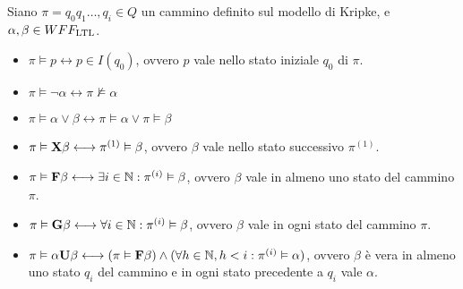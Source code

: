 Siano $\pi = q_0 q_1 \ldots, q_i \in Q$ un cammino definito sul modello di Kripke, e $\alpha, \beta \in WFF_{\textnormal{LTL}}$.
\begin{itemize}
    \item $\pi \vDash p \longleftrightarrow p \in I(q_0)$, ovvero $p$ vale nello stato iniziale $q_0$ di $\pi$.
    \item $\pi \vDash \lnot \alpha \longleftrightarrow \pi \nvDash \alpha$
    \item $\pi \vDash \alpha \lor \beta \longleftrightarrow \pi \vDash \alpha \lor \pi \vDash \beta$
    \item $\pi \vDash \textnormal{\textbf{X}} \beta \longleftrightarrow \pi^{(1)} \vDash \beta$, ovvero $\beta$ vale nello stato successivo $\pi^{(1)}$.
    \item $\pi \vDash \textnormal{\textbf{F}} \beta \longleftrightarrow \exists i \in \mathbb{N} : \pi^{(i)} \vDash \beta$, ovvero $\beta$ vale in almeno uno stato del cammino $\pi$.
    \item $\pi \vDash \textnormal{\textbf{G}} \beta \longleftrightarrow \forall i \in \mathbb{N} : \pi^{(i)} \vDash \beta$, ovvero $\beta$ vale in ogni stato del cammino $\pi$.
    \item $\pi \vDash \alpha \textnormal{\textbf{U}} \beta \longleftrightarrow (\pi \vDash \textnormal{\textbf{F}} \beta) \land (\forall h \in \mathbb{N}, h < i : \pi^{(i)} \vDash \alpha)$, ovvero $\beta$ è vera in almeno uno stato $q_i$ del cammino e in ogni stato precedente a $q_i$ vale $\alpha$.
\end{itemize}